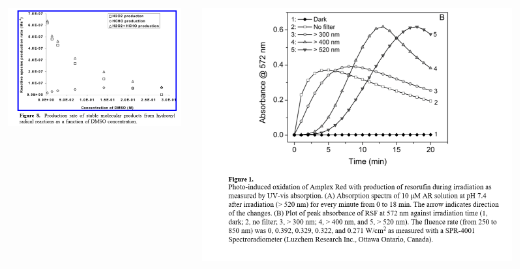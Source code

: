 \documentclass[sans, aspectratio=169]{beamer}
\begin{document}
\begin{frame}
	\begin{columns}
		\begin{column}{0.5\linewidth}
		\centering
		\includegraphics[width=0.8\linewidth]{proposition_from_students/I_dont_like_Constance.png} 
		\end{column}
		\vline
		\begin{column}{0.5\linewidth}
		\centering
		\includegraphics[width=0.8\linewidth]{proposition_from_students/I_like_Constance.png} 
		\end{column}
	\end{columns}
\end{frame}
\end{document}
